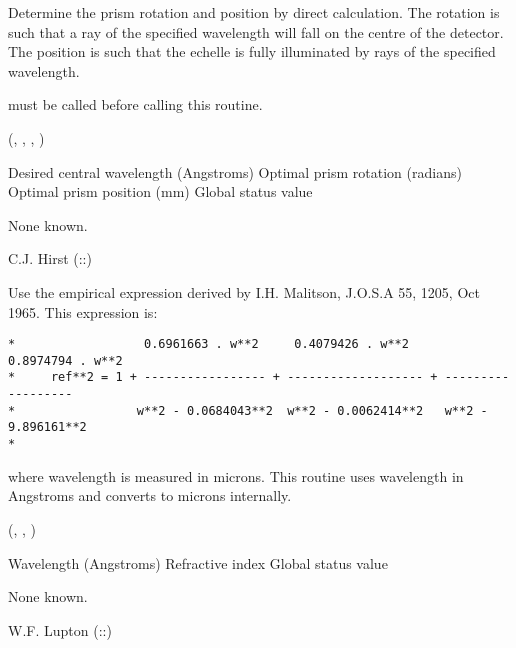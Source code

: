 \begin{manroutinedescription}
     Determine the prism rotation and position by direct calculation. The
     rotation is such that a ray of the specified wavelength will fall on
     the centre of the detector. The position is such that the echelle is
     fully illuminated by rays of the specified wavelength.

     {} must be called before calling this routine.

     {} {} ({}, {}, {%
}, {})

\begin{manparametertable}
Desired central wavelength (Angstroms)
Optimal prism rotation (radians)
Optimal prism position (mm)
 Global status value
\end{manparametertable}
     None known.

     C.J. Hirst  {}  ({}::{})

\end{manroutinedescription}
\begin{manroutinedescription}
     Use the empirical expression derived by I.H. Malitson, J.O.S.A 55, 1205,
     Oct 1965. This expression is:
     \begin{verbatim}
*                  0.6961663 . w**2     0.4079426 . w**2      0.8974794 . w**2
*     ref**2 = 1 + ----------------- + ------------------- + ------------------
*                 w**2 - 0.0684043**2  w**2 - 0.0062414**2   w**2 - 9.896161**2
*     \end{verbatim}
     where wavelength is measured in microns. This routine uses wavelength in
     Angstroms and converts to microns internally.

     {} {} ({}, {}, {%
})

\begin{manparametertable}
Wavelength (Angstroms)
Refractive index
 Global status value
\end{manparametertable}
     None known.

     W.F. Lupton  {}  ({}::{})

\end{manroutinedescription}
